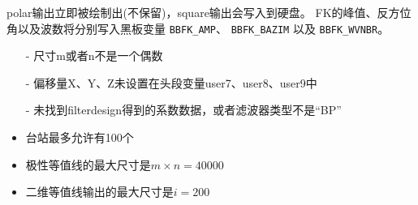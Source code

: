 polar输出立即被绘制出(不保留)，square输出会写入到硬盘。
FK的峰值、反方位角以及波数将分别写入黑板变量 \verb|BBFK_AMP|、
\verb|BBFK_BAZIM| 以及 \verb|BBFK_WVNBR|。

\begin{itemize}
\item[-] 尺寸m或者n不是一个偶数
\item[-] 偏移量X、Y、Z未设置在头段变量user7、user8、user9中
\item[-] 未找到filterdesign得到的系数数据，或者滤波器类型不是``BP''
\end{itemize}

\begin{itemize}
\item 台站最多允许有100个
\item 极性等值线的最大尺寸是$m\times n = 40000$
\item 二维等值线输出的最大尺寸是$i = 200$
\end{itemize}

